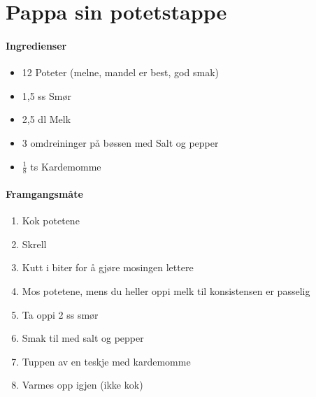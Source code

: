 \section{﻿Pappa sin potetstappe}


\paragraph{Ingredienser}
\begin{itemize}[noitemsep]
	\item 12 Poteter (melne, mandel er best, god smak)
	\item 1,5 ss Smør
	\item 2,5 dl Melk
	\item 3 omdreininger på bøssen med Salt og pepper
	\item $\frac{1}{8}$ ts Kardemomme
\end{itemize}

\paragraph{Framgangsmåte}
\begin{enumerate}[noitemsep]
	\item Kok potetene
	\item Skrell
	\item Kutt i biter for å gjøre mosingen lettere
	\item Mos potetene, mens du heller oppi melk til konsistensen er passelig
	\item Ta oppi 2 ss smør
	\item Smak til med salt og pepper
	\item Tuppen av en teskje med kardemomme
	\item Varmes opp igjen (ikke kok)
\end{enumerate}
